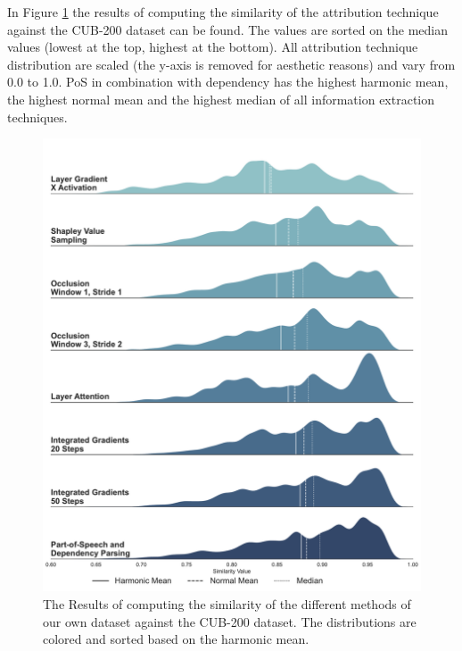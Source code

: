 \documentclass[a4paper, 12pt, oneside]{book} %
\begin{document}
In Figure \ref{fig:hmean_violin} the results of computing the similarity of the attribution technique against the CUB-200 dataset can be found.
The values are sorted on the median values (lowest at the top, highest at the bottom).
All attribution technique distribution are scaled (the y-axis is removed for aesthetic reasons) and vary from 0.0 to 1.0.
PoS in combination with dependency has the highest harmonic mean, the highest normal mean and the highest median of all information extraction techniques.
\begin{figure}[htpb]
 \centering
 \includegraphics[width=\textwidth]{figures/densities.pdf}
 \caption[Similarity results]{The Results of computing the similarity of the different methods of our own dataset against the CUB-200 dataset. The distributions are colored and sorted based on the harmonic mean.}
 \label{fig:hmean_violin}
\end{figure}
\end{document}
